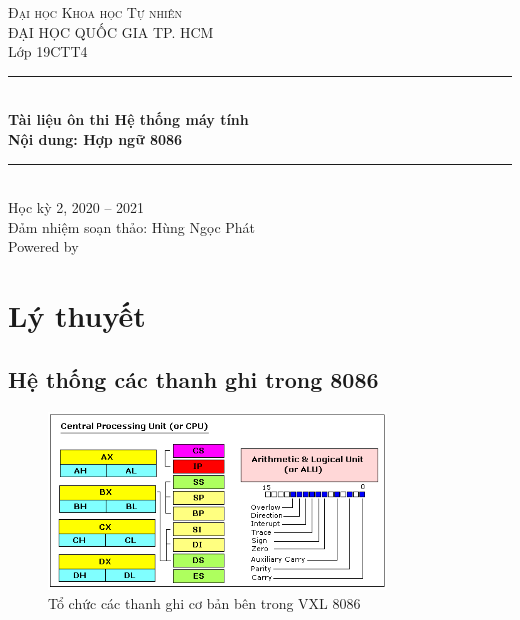 \documentclass[12pt]{report}
\begin{document}
\begin{titlepage}
    \vspace*{\fill}

    \centering
    \textsc{\LARGE Đại học Khoa học Tự nhiên}\\[0.5cm]
    \textsc{\large ĐẠI HỌC QUỐC GIA TP. HCM}\\[0.5cm]
    
    {\Large Lớp 19CTT4}\\[1.5cm]

    \rule{\textwidth}{0.4pt} \\[0.4cm]
    {
        \huge \bfseries Tài liệu ôn thi Hệ thống máy tính\\
        Nội dung: Hợp ngữ 8086
    }
    \rule{\textwidth}{0.4pt}\\[1.5cm]
    
    {\Large Học kỳ 2, 2020 -- 2021}\\[1.5cm]
    Đảm nhiệm soạn thảo: Hùng Ngọc Phát \\
    Powered by \LaTeXe
    \vspace*{\fill}

\end{titlepage}



\renewcommand*\contentsname{Mục lục}
\setcounter{tocdepth}{2}
\tableofcontents
\pagebreak

\chapter{Lý thuyết}
\pagebreak

\section{Hệ thống các thanh ghi trong 8086}

\begin{figure}[H]
    \centering
    \includegraphics[width=0.8\textwidth]{image/cpu.png}
    \caption{Tổ chức các thanh ghi cơ bản bên trong VXL 8086}
\end{figure}
\end{document}
